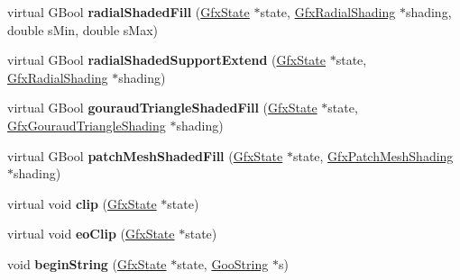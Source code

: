 \begin{DoxyCompactItemize}
\item 
\mbox{\label{class_cairo_output_dev_a85bd293392c2c65746ba4997f558e78b}} 
virtual G\+Bool {\bfseries radial\+Shaded\+Fill} (\hyperlink{class_gfx_state}{Gfx\+State} $\ast$state, \hyperlink{class_gfx_radial_shading}{Gfx\+Radial\+Shading} $\ast$shading, double s\+Min, double s\+Max)
\item 
\mbox{\label{class_cairo_output_dev_aea203e142964d17118c87083b21cbb84}} 
virtual G\+Bool {\bfseries radial\+Shaded\+Support\+Extend} (\hyperlink{class_gfx_state}{Gfx\+State} $\ast$state, \hyperlink{class_gfx_radial_shading}{Gfx\+Radial\+Shading} $\ast$shading)
\item 
\mbox{\label{class_cairo_output_dev_ab65245e3dbd390c511d3cf08ff528f82}} 
virtual G\+Bool {\bfseries gouraud\+Triangle\+Shaded\+Fill} (\hyperlink{class_gfx_state}{Gfx\+State} $\ast$state, \hyperlink{class_gfx_gouraud_triangle_shading}{Gfx\+Gouraud\+Triangle\+Shading} $\ast$shading)
\item 
\mbox{\label{class_cairo_output_dev_a196ddb0472117b8a30bcfdadbf9b7c3b}} 
virtual G\+Bool {\bfseries patch\+Mesh\+Shaded\+Fill} (\hyperlink{class_gfx_state}{Gfx\+State} $\ast$state, \hyperlink{class_gfx_patch_mesh_shading}{Gfx\+Patch\+Mesh\+Shading} $\ast$shading)
\item 
\mbox{\label{class_cairo_output_dev_a18498eb5602e5ea4df6feeac1cbd3bb1}} 
virtual void {\bfseries clip} (\hyperlink{class_gfx_state}{Gfx\+State} $\ast$state)
\item 
\mbox{\label{class_cairo_output_dev_ac27e55214ae20fa4382127aa266fea24}} 
virtual void {\bfseries eo\+Clip} (\hyperlink{class_gfx_state}{Gfx\+State} $\ast$state)
\item 
\mbox{\label{class_cairo_output_dev_a8f0e55fa4647c15044cfe1107529201b}} 
void {\bfseries begin\+String} (\hyperlink{class_gfx_state}{Gfx\+State} $\ast$state, \hyperlink{class_goo_string}{Goo\+String} $\ast$s)
\item 
\mbox{\label{class_cairo_output_dev_a80b2da77deaba96445ce5b5e91ec134a}} 

\end{DoxyCompactItemize}
